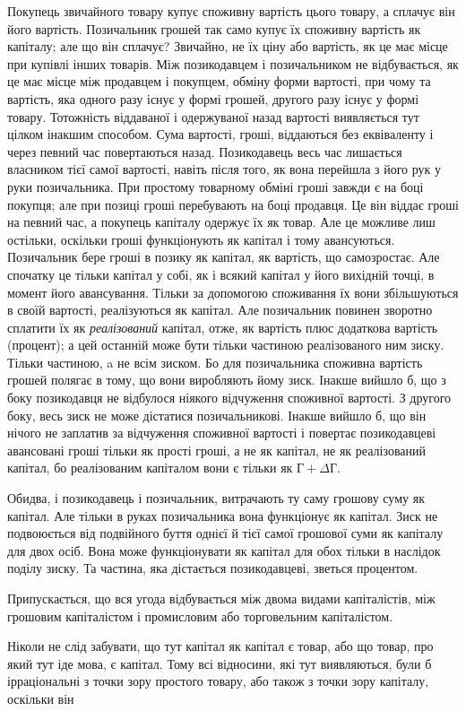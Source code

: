 Покупець звичайного товару купує споживну вартість цього
товару, а сплачує він його вартість. Позичальник грошей так само
купує їх споживну вартість як капіталу; але що він сплачує?
Звичайно, не їх ціну або вартість, як це має місце при купівлі
інших товарів. Між позикодавцем і позичальником не відбувається,
як це має місце між продавцем і покупцем, обміну форми
вартості, при чому та вартість, яка одного разу існує у формі грошей,
другого разу існує у формі товару. Тотожність віддаваної і
одержуваної назад вартості виявляється тут цілком інакшим способом.
Сума вартості, гроші, віддаються без еквіваленту і через
певний час повертаються назад. Позикодавець весь час
лишається власником тієї самої вартості, навіть після того, як вона
перейшла з його рук у руки позичальника. При простому товарному
обміні гроші завжди є на боці покупця; але при позиці гроші
перебувають на боці продавця. Це він віддає гроші на певний
час, а покупець капіталу одержує їх як товар. Але це можливе
лиш остільки, оскільки гроші функціонують як капітал і тому
авансуються. Позичальник бере гроші в позику як капітал, як
вартість, що самозростає. Але спочатку це тільки капітал у
собі, як і всякий капітал у його вихідній точці, в момент його
авансування. Тільки за допомогою споживання їх вони збільшуються
в своїй вартості, реалізуються як капітал. Але позичальник
повинен зворотно сплатити їх як \emph{реалізований} капітал,
отже, як вартість плюс додаткова вартість (процент); а цей
останній може бути тільки частиною реалізованого ним зиску.
Тільки частиною, a не всім зиском. Бо для позичальника споживна
вартість грошей полягає в тому, що вони виробляють
йому зиск. Інакше вийшло б, що з боку позикодавця не відбулося
ніякого відчуження споживної вартості. З другого боку,
весь зиск не може дістатися позичальникові. Інакше вийшло б,
що він нічого не заплатив за відчуження споживної вартості і
повертає позикодавцеві авансовані гроші тільки як прості гроші,
а не як капітал, не як реалізований капітал, бо реалізованим
капіталом вони є тільки як $Г + ΔГ$.

Обидва, і позикодавець і позичальник, витрачають ту саму
грошову суму як капітал. Але тільки в руках позичальника вона
функціонує як капітал. Зиск не подвоюється від подвійного
буття однієї й тієї самої грошової суми як капіталу для двох
осіб. Вона може функціонувати як капітал для обох тільки в
наслідок поділу зиску. Та частина, яка дістається позикодавцеві,
зветься процентом.

Припускається, що вся угода відбувається між двома видами
капіталістів, між грошовим капіталістом і промисловим або торговельним
капіталістом.

Ніколи не слід забувати, що тут капітал як капітал є товар,
або що товар, про який тут іде мова, є капітал. Тому всі відносини,
які тут виявляються, були б ірраціональні з точки зору
простого товару, або також з точки зору капіталу, оскільки він
\parbreak{}  %
